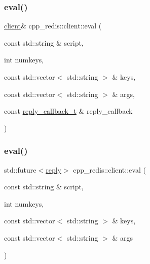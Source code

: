 \mbox{\label{classcpp__redis_1_1client_aeb773d0e0cacb766a0c4c7641bd91ebf}} 
\subsubsection{\texorpdfstring{eval()}{eval()}\hspace{0.1cm}{\footnotesize\ttfamily [1/2]}}
{\footnotesize\ttfamily \hyperlink{classcpp__redis_1_1client}{client}\& cpp\+\_\+redis\+::client\+::eval (\begin{DoxyParamCaption}\item[{const std\+::string \&}]{script,  }\item[{int}]{numkeys,  }\item[{const std\+::vector$<$ std\+::string $>$ \&}]{keys,  }\item[{const std\+::vector$<$ std\+::string $>$ \&}]{args,  }\item[{const \hyperlink{classcpp__redis_1_1client_a061a1140d36d2eaeda82b09a0bb3f9f2}{reply\+\_\+callback\+\_\+t} \&}]{reply\+\_\+callback }\end{DoxyParamCaption})}

\mbox{\label{classcpp__redis_1_1client_a01b328b664e5cf604150e3d0f881ff4c}} 
\subsubsection{\texorpdfstring{eval()}{eval()}\hspace{0.1cm}{\footnotesize\ttfamily [2/2]}}
{\footnotesize\ttfamily std\+::future$<$\hyperlink{classcpp__redis_1_1reply}{reply}$>$ cpp\+\_\+redis\+::client\+::eval (\begin{DoxyParamCaption}\item[{const std\+::string \&}]{script,  }\item[{int}]{numkeys,  }\item[{const std\+::vector$<$ std\+::string $>$ \&}]{keys,  }\item[{const std\+::vector$<$ std\+::string $>$ \&}]{args }\end{DoxyParamCaption})}

